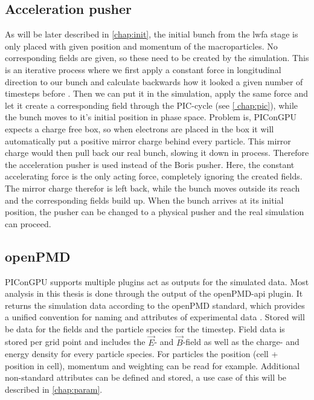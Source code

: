 \documentclass[bachelor_thesis]{subfiles}
\begin{document}
\subsection{Acceleration pusher} \label{chap:accpush}
As will be later described in \autoref{chap:init}, the initial bunch from the \gls{lwfa} stage is only placed with given position and momentum of the macroparticles.
No corresponding fields are given, so these need to be created by the simulation. This is an iterative process where we first apply a constant force in longitudinal direction to our bunch and calculate backwards how it looked a given number of timesteps before \cite{Huebl2014}.
Then we can put it in the simulation, apply the same force and let it create a corresponding field through the PIC-cycle (see \autoref{	chap:pic}), while the bunch moves to it's initial position in phase space. 
Problem is, PIConGPU expects a charge free box, so when electrons are placed in the box it will automatically put a positive mirror charge behind every particle. This mirror charge would then pull back our real 
bunch, slowing it down in process. Therefore the acceleration pusher is used instead of the Boris pusher. Here, the constant accelerating force is the only acting force, completely ignoring the created fields.
The mirror charge therefor is left back, while the bunch moves outside its reach and the corresponding fields build up. When the bunch arrives at its initial position, the pusher can be changed to a physical pusher and
the real simulation can proceed.


\subsection{openPMD}
PIConGPU supports multiple plugins act as outputs for the simulated data. Most analysis in this thesis is done through the output of the openPMD-api \cite{openPMDAPI} plugin.
It returns the simulation data according to the openPMD standard, which provides a unified convention for naming and attributes of experimental data \cite{openPMDstandard}.
Stored will be data for the fields and the particle species for the timestep. Field data is stored per grid point and includes the $\vec{E}$- and $\vec{B}$-field as well as the charge- and energy density for every particle species.
For particles the position (cell + position in cell), momentum and weighting can be read for example. Additional non-standard attributes can be defined and stored, a use case of this will be described in \autoref{chap:param}.
\end{document}
